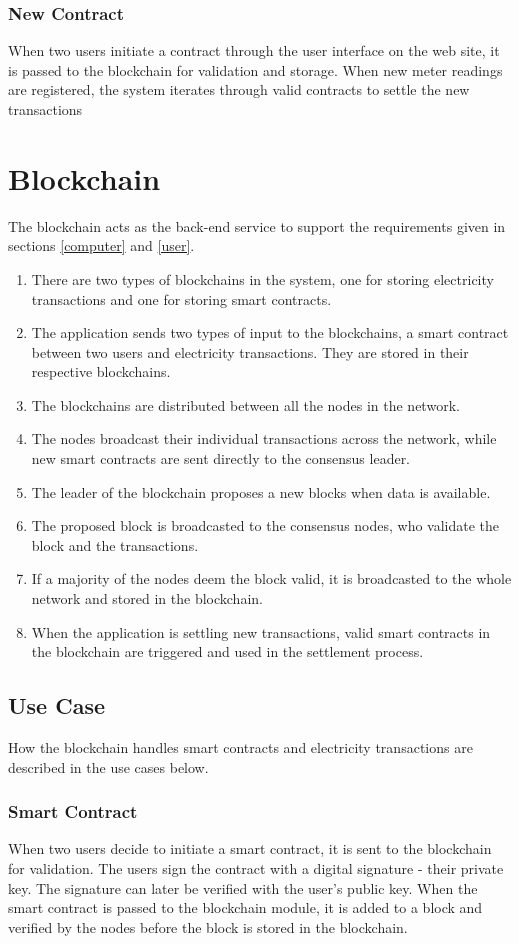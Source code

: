 \subsubsection*{New Contract}
When two users initiate a contract through the user interface on the web site, it is passed to the blockchain for validation and storage. When new meter readings are registered, the system iterates through valid contracts to settle the new transactions

\section{Blockchain}
The blockchain acts as the back-end service to support the requirements given in sections \ref{computer} and \ref{user}.
\begin{enumerate}
\item There are two types of blockchains in the system, one for storing electricity transactions and one for storing smart contracts.
\item The application sends two types of input to the blockchains, a smart contract between two users and electricity transactions. They are stored in their respective blockchains.
\item The blockchains are distributed between all the nodes in the network. 
\item The nodes broadcast their individual transactions across the network, while new smart contracts are sent directly to the consensus leader.
\item The leader of the blockchain proposes a new blocks when data is available.
\item The proposed block is broadcasted to the consensus nodes, who validate the block and the transactions.
\item If a majority of the nodes deem the block valid, it is broadcasted to the whole network and stored in the blockchain.
\item When the application is settling new transactions, valid smart contracts in the blockchain are triggered and used in the settlement process. 
\end{enumerate}

\subsection{Use Case}
How the blockchain handles smart contracts and electricity transactions are described in the use cases below.
\subsubsection*{Smart Contract}
When two users decide to initiate a smart contract, it is sent to the blockchain for validation. The users sign the contract with a digital signature - their private key. The signature can later be verified with the user's public key.
When the smart contract is passed to the blockchain module, it is added to a block and verified by the nodes before the block is stored in the blockchain.
 
